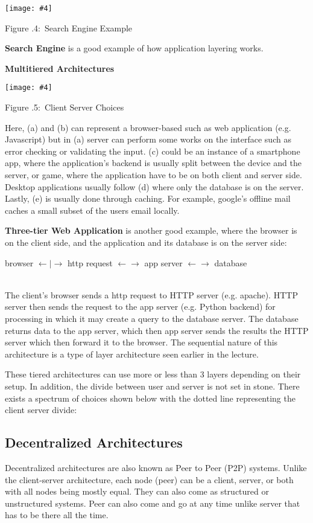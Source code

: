\documentclass[twoside]{article}
\newcounter{lecnum}
\newcommand{\fig}[4]{
            \centerline{\texttt{[image: \#4]}}
            \begin{center}
            Figure \thelecnum.#1:~#3
            \end{center}
    }
\begin{document}
\fig{4}{0.5}{Search Engine Example}{searchengine.png}

\textbf{Search Engine} is a good example of how application layering works.

\textbf{Multitiered Architectures} 

\fig{5}{0.4}{Client Server Choices}{choices.png}
Here, (a) and (b) can represent a browser-based such as web application (e.g. Javascript) but in (a) server can perform some works on the interface such as error checking or validating the input.  (c) could be an instance of a smartphone app, where the application's backend is usually split between the device and the server, or game, where the application have to be on both client and server side. Desktop applications usually follow (d) where only the database is on the server. Lastly, (e) is usually done through caching. For example, google's offline mail caches a small subset of the users email locally.

\textbf{Three-tier Web Application} is another good example, where the browser is on the client side, and the application and its database is on the server side:\\
        \centerline{browser $\leftarrow|\rightarrow$ http request $\leftarrow\rightarrow$ app server $\leftarrow\rightarrow$ database }\\
        
The client's browser sends a http request to HTTP server (e.g. apache). HTTP server then sends the request to the app server (e.g. Python backend) for processing in which it may create a query to the database server. The database returns data to the app server, which then app server sends the results the HTTP server which then forward it to the browser. The sequential nature of this architecture is a type of layer architecture seen earlier in the lecture.

These tiered architectures can use more or less than 3 layers depending on their setup. In addition, the divide between user and server is not set in stone. There exists a spectrum of choices shown below with the dotted line representing the client server divide:

\subsection{Decentralized Architectures}

Decentralized architectures are also known as Peer to Peer (P2P) systems. Unlike the client-server architecture, each node (peer) can be a client, server, or both with all nodes being mostly equal. They can also come as structured or unstructured systems. Peer can also come and go at any time unlike server that has to be there all the time.
\end{document}
